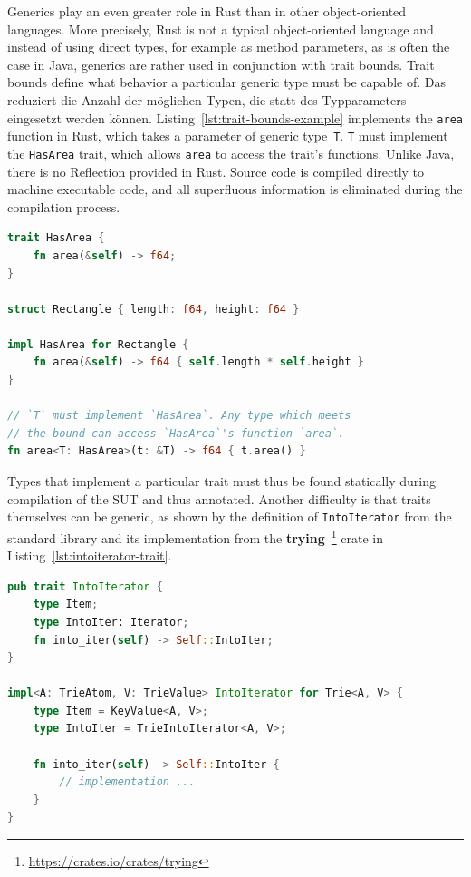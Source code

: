 \documentclass{article}
\begin{document}
Generics play an even greater role in Rust than in other object-oriented languages. More precisely, Rust is not a typical object-oriented language and instead of using direct types, for example as method parameters, as is often the case in Java, generics are rather used in conjunction with trait bounds. Trait bounds define what behavior a particular generic type must be capable of. Das reduziert die Anzahl der möglichen Typen, die statt des Typparameters eingesetzt werden können. Listing~\ref{lst:trait-bounds-example} implements the \lstinline{area} function in Rust, which takes a parameter of generic type~\lstinline{T}. \lstinline{T} must implement the \lstinline{HasArea} trait, which allows \lstinline{area} to access the trait's functions. Unlike Java, there is no Reflection provided in Rust. Source code is compiled directly to machine executable code, and all superfluous information is eliminated during the compilation process.

\begin{lstlisting}[language=Rust, style=boxed, caption={A function that takes a generic types and specifies a bound}, label=lst:trait-bounds-example]
trait HasArea {
    fn area(&self) -> f64;
}

struct Rectangle { length: f64, height: f64 }

impl HasArea for Rectangle {
    fn area(&self) -> f64 { self.length * self.height }
}

// `T` must implement `HasArea`. Any type which meets
// the bound can access `HasArea`'s function `area`.
fn area<T: HasArea>(t: &T) -> f64 { t.area() }
\end{lstlisting}

Types that implement a particular trait must thus be found statically during compilation of the \ac{SUT} and thus annotated. Another difficulty is that traits themselves can be generic, as shown by the definition of \lstinline{IntoIterator} from the standard library and its implementation from the \textbf{trying}~\footnote{\url{https://crates.io/crates/trying}} crate in Listing~\ref{lst:intoiterator-trait}.

\begin{lstlisting}[language=Rust, style=boxed, caption={IntoIterator implementation in the \textbf{trying} crate}, label=lst:intoiterator-trait]
pub trait IntoIterator {
    type Item;
    type IntoIter: Iterator;
    fn into_iter(self) -> Self::IntoIter;
}

impl<A: TrieAtom, V: TrieValue> IntoIterator for Trie<A, V> {
    type Item = KeyValue<A, V>;
    type IntoIter = TrieIntoIterator<A, V>;

    fn into_iter(self) -> Self::IntoIter {
        // implementation ...
    }
}
\end{lstlisting}
\end{document}
